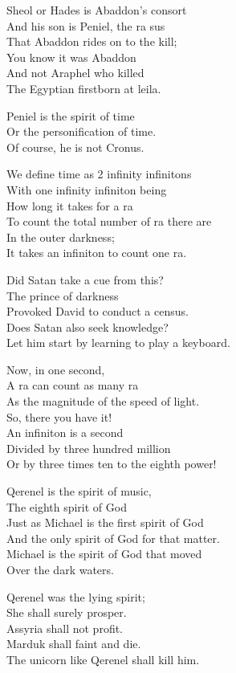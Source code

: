\documentclass[
]{book}
\begin{document}
Sheol or Hades is Abaddon's consort\\
And his son is Peniel, the ra sus\\
That Abaddon rides on to the kill;\\
You know it was Abaddon\\
And not Araphel who killed\\
The Egyptian firstborn at leila.

Peniel is the spirit of time\\
Or the personification of time.\\
Of course, he is not Cronus.

We define time as 2 infinity infinitons\\
With one infinity infiniton being\\
How long it takes for a ra\\
To count the total number of ra there are\\
In the outer darkness;\\
It takes an infiniton to count one ra.

Did Satan take a cue from this?\\
The prince of darkness\\
Provoked David to conduct a census.\\
Does Satan also seek knowledge?\\
Let him start by learning to play a keyboard.

Now, in one second,\\
A ra can count as many ra\\
As the magnitude of the speed of light.\\
So, there you have it!\\
An infiniton is a second\\
Divided by three hundred million\\
Or by three times ten to the eighth power!

Qerenel is the spirit of music,\\
The eighth spirit of God\\
Just as Michael is the first spirit of God\\
And the only spirit of God for that matter.\\
Michael is the spirit of God that moved\\
Over the dark waters.

Qerenel was the lying spirit;\\
She shall surely prosper.\\
Assyria shall not profit.\\
Marduk shall faint and die.\\
The unicorn like Qerenel shall kill him.
\end{document}
